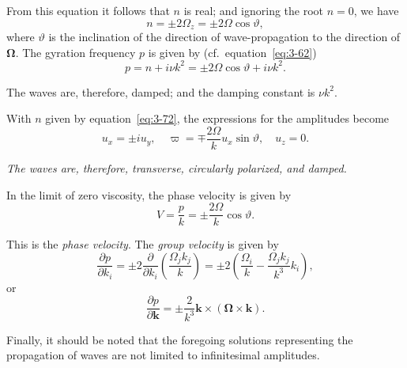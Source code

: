 From this equation it follows that $n$ is real; and ignoring the root $n = 0$, we have
\begin{equation}\label{eq:3-71}
n = \pm 2\Omega_z = \pm 2\Omega\cos\vartheta,
\end{equation}
where $\vartheta$ is the inclination of the direction of wave-propagation to the direction of $\boldsymbol{\Omega}$. The gyration frequency $p$ is given by (cf.\ equation~\eqref{eq:3-62})
\begin{equation}\label{eq:3-72}
p = n + i\nu k^2 = \pm 2\Omega\cos\vartheta + i\nu k^2.
\end{equation}

The waves are, therefore, damped; and the damping constant is $\nu k^2$.

With $n$ given by equation~\eqref{eq:3-72}, the expressions for the amplitudes become
\begin{equation}\label{eq:3-73}
u_x = \pm i u_y, \quad \varpi = \mp\frac{2\Omega}{k}u_x\sin\vartheta, \quad u_z = 0.
\end{equation}

\emph{The waves are, therefore, transverse, circularly polarized, and damped.}

In the limit of zero viscosity, the phase velocity is given by
\begin{equation}\label{eq:3-74}
V = \frac{p}{k} = \pm\frac{2\Omega}{k}\cos\vartheta.
\end{equation}

This is the \emph{phase velocity}. The \emph{group velocity} is given by
\begin{equation}\label{eq:3-75}
\frac{\partial p}{\partial k_i} = \pm 2\frac{\partial}{\partial k_i}\!\left(\frac{\Omega_j k_j}{k}\right) = \pm 2\!\left(\frac{\Omega_i}{k} - \frac{\Omega_j k_j}{k^3}k_i\right),
\end{equation}
or
\begin{equation}\label{eq:3-76}
\frac{\partial p}{\partial \mathbf{k}} = \pm\frac{2}{k^3}\mathbf{k}\times(\boldsymbol{\Omega}\times\mathbf{k}).
\end{equation}

Finally, it should be noted that the foregoing solutions representing the propagation of waves are not limited to infinitesimal amplitudes.

